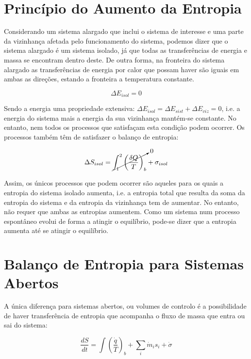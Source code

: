 \section{Princípio do Aumento da Entropia}

Considerando um sistema alargado que inclui o sistema de interesse e uma parte da vizinhança afetada pelo funcionamento do sistema, podemos dizer que o sistema alargado é um sistema isolado, já que todas as transferências de energia e massa se encontram dentro deste. De outra forma, na fronteira do sistema alargado as transferências de energia por calor que possam haver são iguais em ambas as direções, estando a fronteira a temperatura constante.

\begin{equation*}
    \Delta E_{isol} = 0
\end{equation*}

Sendo a energia uma propriedade extensiva: $ \Delta E_{isol} = \Delta E_{sist} + \Delta E_{viz} = 0$, i.e. a energia do sistema mais a energia da sua vizinhança mantém-se constante. No entanto, nem todos os processos que satisfaçam esta condição podem ocorrer. Os processos também têm de satisfazer o balanço de entropia:

\begin{equation*}
    \Delta S_{isol} = \cancelto{0}{\int_1^2 \left( \frac{\delta Q}{T} \right)_b} + \sigma_{isol}
\end{equation*}

Assim, os únicos processos que podem ocorrer são aqueles para os quais a entropia do sistema isolado aumenta, i.e. a entropia total que resulta da soma da entropia do sistema e da entropia da vizinhança tem de aumentar. No entanto, não requer que ambas as entropias aumentem. Como um sistema num processo espontâneo evolui de forma a atingir o equilíbrio, pode-se dizer que a entropia aumenta até se atingir o equilíbrio.


\section{Balanço de Entropia para Sistemas Abertos}


A única diferença para sistemas abertos, ou volumes de controlo é a possibilidade de haver transferência de entropia que acompanha o fluxo de massa que entra ou sai do sistema:

\begin{equation}
    \frac{dS}{dt} = \int \left( \frac{\dot{q}}{T} \right)_b + \sum_i \dot{m}_i s_i + \dot{\sigma}
\end{equation}


